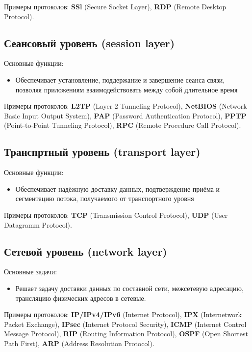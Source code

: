 \documentclass[10pt,a4paper,oneside,titlepage]{report}
\theoremstyle{defenition}
\begin{document}
Примеры протоколов: {\bfseries SSl} (Secure Socket Layer), {\bfseries RDP} (Remote Desktop Protocol).

\subsection{Сеансовый уровень (session layer)}

Основные функции:
\begin{itemize}
	\item Обеспечивает установление, поддержание и завершение сеанса связи, позволяя приложениям взаимодействовать между собой длительное время
\end{itemize}

Примеры протоколов: {\bfseries L2TP} (Layer 2 Tunneling Protocol), {\bfseries NetBIOS} (Network Basic Input Output System), {\bfseries PAP} (Password Authentication Protocol), {\bfseries PPTP} (Point-to-Point Tunneling Protocol), {\bfseries RPC} (Remote Procedure Call Protocol).

\subsection{Транспртный уровень (transport layer)}

Основные функции:
\begin{itemize}
	\item Обеспечивает надёжную доставку данных, подтверждение приёма и сегментацию потока, получаемого от транспортного уровня
\end{itemize}

Примеры протоколов: {\bfseries TCP} (Transmission Control Protocol), {\bfseries UDP} (User Datagramm Protocol).

\subsection{Сетевой уровень (network layer)} 

Основные задачи:
\begin{itemize}
	\item Решает задачу доставки данных по составной сети, межсетевую адресацию, трансляцию физических адресов в сетевые.
\end{itemize}

Примеры протоколов: {\bfseries IP/IPv4/IPv6} (Internet Protocol), {\bfseries IPX} (Internetwork Packet Exchange), {\bfseries IPsec} (Internet Protocol Security), {\bfseries ICMP} (Internet Control Message Protocol), {\bfseries RIP} (Routing Information Protocol), {\bfseries OSPF} (Open Shortest Path First), {\bfseries ARP} (Address Resolution Protocol).
\end{document}
